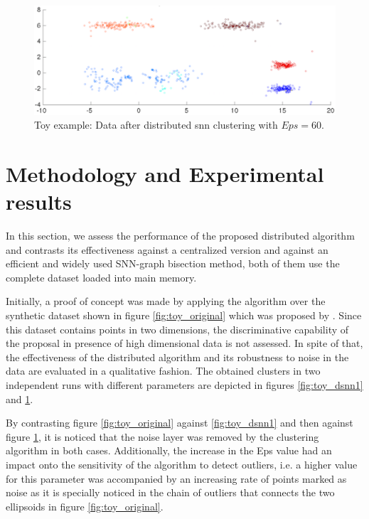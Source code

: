 \documentclass[a4paper]{article}
\begin{document}
\begin{figure}[!htbp]
\centering
  \includegraphics[scale=0.5]{toy_example_after_Dsnn_1.pdf}
  \caption{Toy example: Data after distributed snn clustering with $Eps=60$.}
  \label{fig:toy_dsnn2}
\end{figure}



\section{Methodology and Experimental results}
In this section, we assess the performance of the proposed distributed algorithm and contrasts its effectiveness against a centralized version and against an efficient and widely used SNN-graph bisection method\cite{ZK02}, both of them use the complete dataset loaded into main memory.

Initially, a proof of concept was made by applying the algorithm over the synthetic dataset shown in figure \ref{fig:toy_original} which was proposed by \cite{GRS98}. Since this dataset contains points in two dimensions, the discriminative capability of the proposal in presence of  high dimensional data is not assessed. In spite of that, the effectiveness of the distributed algorithm and its robustness to noise in the data are evaluated in a qualitative fashion. The obtained clusters in two independent runs with different parameters are depicted in figures \ref{fig:toy_dsnn1} and \ref{fig:toy_dsnn2}.

By contrasting figure \ref{fig:toy_original} against \ref{fig:toy_dsnn1} and then against figure \ref{fig:toy_dsnn2}, it is noticed that the noise layer was removed by the clustering algorithm in both cases. Additionally, the increase in the Eps value had an impact onto the sensitivity of the algorithm to detect outliers, i.e. a higher value for this parameter was accompanied by an increasing rate of points marked as noise as it is specially noticed in the chain of outliers that connects the two ellipsoids in figure \ref{fig:toy_original}.
\end{document}
